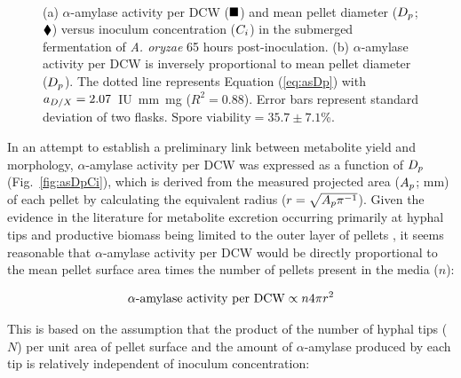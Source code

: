 \begin{figure}[htbp]
	\captionsetup[subfloat]{position=top}
	\centering
	\\
	\caption{(a) $\alpha$-amylase activity per DCW ($\blacksquare$) and mean pellet diameter ($D_p$; $\blacklozenge$) versus inoculum concentration ($C_i$) in the submerged fermentation of \emph{A. oryzae} 65 hours post-inoculation. (b) $\alpha$-amylase activity per DCW is inversely proportional to mean pellet diameter ($D_p$). The dotted line represents Equation (\ref{eq:asDp}) with $a_{D/X} = 2.07$~IU~mm~mg ($R^2 = 0.88$). Error bars represent standard deviation of two flasks. $\mbox{Spore viability} =35.7 \pm 7.1$\%.}
	\label{fig:Inoc}
\end{figure}

In an attempt to establish a preliminary link between metabolite yield and morphology, $\alpha$-amylase activity per DCW was expressed as a function of $D_p$ (Fig.~\ref{fig:asDpCi}), which is derived from the measured projected area ($A_p$; mm) of each pellet by calculating the equivalent radius ($r = \sqrt{A_p\pi^{-1}}$). Given the evidence in the literature for metabolite excretion occurring primarily at hyphal tips \cite{gordon2000,muller2002} and productive biomass being limited to the outer layer of pellets \cite{pirt1966,elenshasy2006}, it seems reasonable that $\alpha$-amylase activity per DCW would be directly proportional to the mean pellet surface area times the number of pellets present in the media ($n$):

\begin{equation} \label{eq:asnr}
	\hbox{$\alpha$-amylase activity per DCW} \propto n4\pi r^2 
\end{equation}

\noindent This is based on the assumption that the product of the number of hyphal tips ($N$) per unit area of pellet surface and the amount of $\alpha$-amylase produced by each tip is relatively independent of inoculum concentration:

